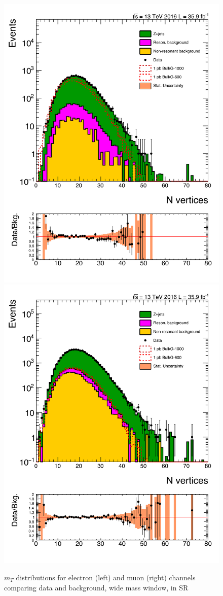 \begin{figure}[htbp!]
\centering
\includegraphics[width=0.46\linewidth,page=3]{figures/ReMiniSummer16_DT_PhReMiniMCRcFixXsec_GMCPhPtWt_SRdPhiGT0p5_puWeightsummer16_muoneg_gjet_metfilter_unblind_el_log_1pb.pdf}
\includegraphics[width=0.46\linewidth,page=3]{figures/ReMiniSummer16_DT_PhReMiniMCRcFixXsec_GMCPhPtWt_SRdPhiGT0p5_puWeightsummer16_muoneg_gjet_metfilter_unblind_mu_log_1pb.pdf}
\caption{$m_T$ distributions for electron (left) and muon (right) channels
comparing data and background, 
wide mass window, in SR}
\label{fig:SR_gjet_mt_wide}
\end{figure}

